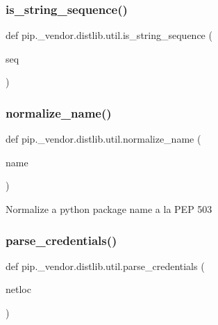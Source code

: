 \subsubsection{\texorpdfstring{is\+\_\+string\+\_\+sequence()}{is\_string\_sequence()}}
{\footnotesize\ttfamily def pip.\+\_\+vendor.\+distlib.\+util.\+is\+\_\+string\+\_\+sequence (\begin{DoxyParamCaption}\item[{}]{seq }\end{DoxyParamCaption})}

\mbox{\label{namespacepip_1_1__vendor_1_1distlib_1_1util_a1c4bf3d6549dfc63734fcff5b15a76a0}} 
\subsubsection{\texorpdfstring{normalize\+\_\+name()}{normalize\_name()}}
{\footnotesize\ttfamily def pip.\+\_\+vendor.\+distlib.\+util.\+normalize\+\_\+name (\begin{DoxyParamCaption}\item[{}]{name }\end{DoxyParamCaption})}

\begin{DoxyVerb}Normalize a python package name a la PEP 503\end{DoxyVerb}
 \mbox{\label{namespacepip_1_1__vendor_1_1distlib_1_1util_accb502b767f0b1560da9275ef4a7605d}} 
\subsubsection{\texorpdfstring{parse\+\_\+credentials()}{parse\_credentials()}}
{\footnotesize\ttfamily def pip.\+\_\+vendor.\+distlib.\+util.\+parse\+\_\+credentials (\begin{DoxyParamCaption}\item[{}]{netloc }\end{DoxyParamCaption})}

